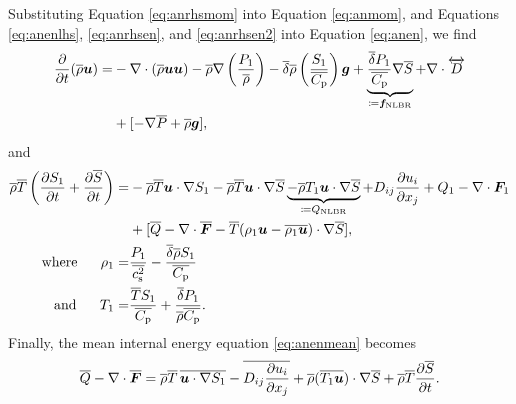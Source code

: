 \documentclass[12pt]{article}
\newcommand{\vecf}{\bm{F}}
\begin{document}
Substituting Equation \eqref{eq:anrhsmom} into Equation \eqref{eq:anmom}, and Equations \eqref{eq:anenlhs}, \eqref{eq:anrhsen}, and \eqref{eq:anrhsen2} into Equation \eqref{eq:anen}, we find
	\begin{align}\label{eq:anmommod}
		\frac{\partial}{\partial t}(\overline{\rho}\bm{u})= &-\nabla\cdot(\overline{\rho}\bm{u}\bm{u}) -\overline{\rho}\nabla\left(\frac{P_1}{\overline{\rho}}\right) - \overline{\delta} \overline{\rho} \left(\frac{S_1}{\overline{C_{\rm{p}}}}\right) \bm{g} + \underbrace{\frac{\overline{\delta} P_1}{\overline{C_{\rm{p}}}} \nabla\overline{S}}_{\coloneqq \bm{f}_{\rm NLBR}}+\nabla\cdot \overleftrightarrow{D}\nonumber\\
		&+[-\nabla\overline{P} + \overline{\rho}\bm{g}],
	\end{align}
and
\begin{subequations}\label{eq:anenmod}
\begin{align}
	\rhoover\tmpover\left(\pderiv{\entrone}{t}+\pderiv{\entrover}{t}\right)= &-\rhoover\tmpover\ugrad \entrone - \rhoover \tmpover \ugrad \entrover \underbrace{- \rhoover \tmpone\ugrad\entrover}_{\define Q_{\rm NLBR}}+D_{ij}\pderiv{u_i}{x_j} + Q _1- \Div\vecf_1  \nonumber\\
	& +[\heatover - \Div\overline{\vecf} - \tmpover(\rhoone\vecu-\overline{\rhoone\vecu})\cdot\nabla\entrover],\\
	\where \rhoone =& \frac{\prsone}{\cssqover}-\frac{\deltaover\rhoover \entrone}{\cpover}\\
	\andd \tmpone = & \frac{\tmpover \entrone}{\cpover} + \frac{\deltaover \prsone}{\rhoover\cpover}.
\end{align}
\end{subequations}
Finally, the mean internal energy equation \eqref{eq:anenmean} becomes
\begin{align}\label{eq:anenmean2}
	\heatover-\Div\overline{\vecf} = \rhoover\tmpover\, \overline{\ugrad \entrone}-\overline{D_{ij}\pderiv{u_i}{x_j}} + \rhoover (\overline{\tmpone\vecu})\dotgrad\entrover + \rhoover\tmpover\pderiv{\entrover}{t}.
\end{align}
\end{document}
